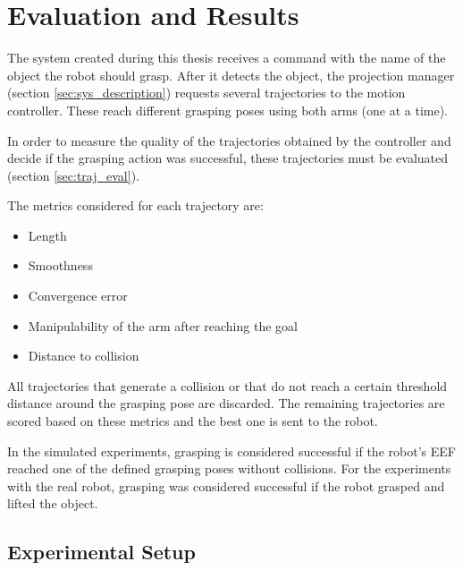 

\chapter{\textbf{Evaluation and Results}}

The system created during this thesis receives a command with the name of the object the robot should grasp. After it detects the object, the projection manager (section \ref{sec:sys_description}) requests several trajectories to the motion controller. These reach different grasping poses using both arms (one at a time).

In order to measure the quality of the trajectories obtained by the controller and decide if the grasping action was successful, these trajectories must be evaluated (section \ref{sec:traj_eval}).

The metrics considered for each trajectory are:
\begin{itemize}
	\item Length
	\item Smoothness
	\item Convergence error
	\item Manipulability of the arm after reaching the goal
	\item Distance to collision
\end{itemize}

All trajectories that generate a collision or that do not reach a certain threshold distance around the grasping pose are discarded. The remaining trajectories are scored based on these metrics and the best one is sent to the robot.

In the simulated experiments, grasping is considered successful if the robot's EEF reached one of the defined grasping poses without collisions. For the experiments with the real robot, grasping was considered successful if the robot grasped and lifted the object.

\section{Experimental Setup}

